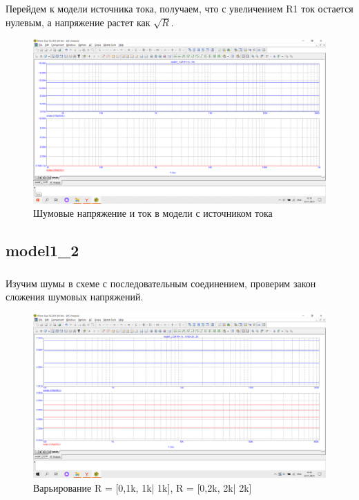 \documentclass[a4paper, 12pt]{article}%
\begin{document}
\subsubsection{}

Перейдем к модели источника тока, получаем, что с увеличением R1 ток остается нулевым, а напряжение растет как $\sqrt{R}$.

\begin{figure}[h!]
    \centering
    \includegraphics[scale = 0.4 \textwidth]{images/mod1_1_3.png}
    \caption{Шумовые напряжение и ток в модели с источником тока}
    \label{fig:R3}
\end{figure}

\subsection{\textbf{model1\_2}}

\subsubsection{}

Изучим шумы в схеме с последовательным соединением, проверим закон сложения шумовых напряжений.

\begin{figure}[h!]
    \centering
    \includegraphics[scale = 0.4 \textwidth]{images/mod1_2_1.png}
    \caption{Варьирование R = [0,1k, 1k| 1k], R = [0,2k, 2k| 2k]}
    \label{fig:1_2_1}
\end{figure}
\end{document}
